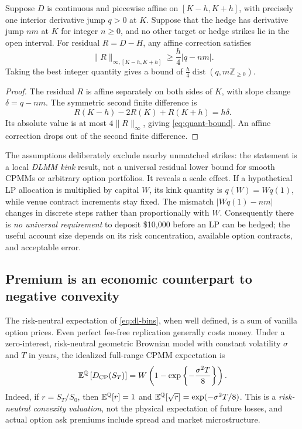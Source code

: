 \begin{proposition}
\label{prop:obstruction}
Suppose $D$ is continuous and piecewise affine on $[K-h,K+h]$, with precisely one interior derivative jump $q>0$ at $K$. Suppose that the hedge has derivative jump $nm$ at $K$ for integer $n\ge0$, and no other target or hedge strikes lie in the open interval. For residual $R=D-H$, any affine correction satisfies
\begin{equation}
\|R\|_{\infty,[K-h,K+h]}
 \ge\frac h4|q-nm|.
\label{eq:quant-bound}
\end{equation}
Taking the best integer quantity gives a bound of
$\frac h4\operatorname{dist}(q,m\mathbb Z_{\ge0})$.
\end{proposition}
\begin{proof}
The residual $R$ is affine separately on both sides of $K$, with slope change $\delta=q-nm$. The symmetric second finite difference is
\[
R(K-h)-2R(K)+R(K+h)=h\delta.
\]
Its absolute value is at most $4\|R\|_\infty$, giving \eqref{eq:quant-bound}. An affine correction drops out of the second finite difference.
\end{proof}
The assumptions deliberately exclude nearby unmatched strikes: the statement is a local \emph{DLMM kink} result, not a universal residual lower bound for smooth CPMMs or arbitrary option portfolios. It reveals a scale effect. If a hypothetical LP allocation is multiplied by capital $W$, its kink quantity is $q(W)=Wq(1)$, while venue contract increments stay fixed. The mismatch $|Wq(1)-nm|$ changes in discrete steps rather than proportionally with $W$. Consequently there is \emph{no universal requirement} to deposit \$10,000 before an LP can be hedged; the useful account size depends on its risk concentration, available option contracts, and acceptable error.

\subsection{Premium is an economic counterpart to negative convexity}
The risk-neutral expectation of \eqref{eq:dl-bins}, when well defined, is a sum of vanilla option prices. Even perfect fee-free replication generally costs money. Under a zero-interest, risk-neutral geometric Brownian model with constant volatility $\sigma$ and $T$ in years, the idealized full-range CPMM expectation is
\begin{equation}
\mathbb{E}^{\mathbb{Q}}\left[D_{\mathrm{CP}}(S_T)\right]
=W\left(1-\exp\left\{-\frac{\sigma^2T}{8}\right\}\right).
\label{eq:cp-expected}
\end{equation}
Indeed, if $r=S_T/S_0$, then $\mathbb{E}^{\mathbb{Q}}[r]=1$ and $\mathbb{E}^{\mathbb{Q}}[\sqrt r]=\exp(-\sigma^2T/8)$. This is a \emph{risk-neutral convexity valuation}, not the physical expectation of future losses, and actual option ask premiums include spread and market microstructure.
